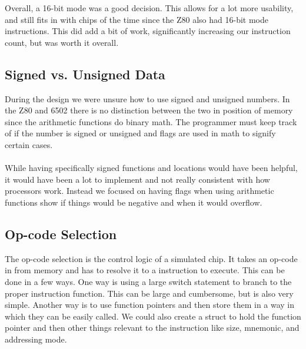 \documentclass[conference]{IEEEtran}
\begin{document}
Overall, a 16-bit mode was a good decision. This allows for a lot more usability, and still fits in with chips of the time since the Z80 also had 16-bit mode instructions. This did add a bit of work, significantly increasing our instruction count,  but was worth it overall.

\subsection{Signed vs. Unsigned Data}

During the design we were unsure how to use signed and unsigned numbers. In the Z80 and 6502 there is no distinction between the two in position of memory since the arithmetic functions do binary math. The programmer must keep track of if the number is signed or unsigned and flags are used in math to signify certain cases.\\

\\

While having specifically signed functions and locations would have been helpful, it would have been a lot to implement and not really consistent with how processors work. Instead we focused on having flags when using arithmetic functions show if things would be negative and when it would overflow.

\subsection{Op-code Selection}

The op-code selection is the control logic of a simulated chip. It takes an op-code in from memory and has to resolve it to a instruction to execute. This can be done in a few ways. One way is using a large switch statement to branch to the proper instruction function. This can be large and cumbersome, but is also very simple. Another way is to use function pointers and then store them in a way in which they can be easily called. We could also create a struct to hold the function pointer and then other things relevant to the instruction like size, mnemonic, and addressing mode.\\
\end{document}
